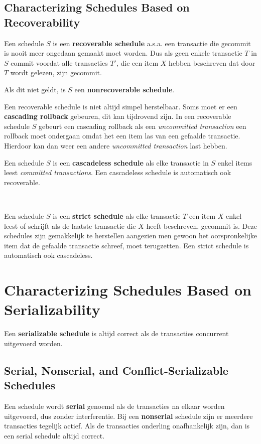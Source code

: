 \subsection{Characterizing Schedules Based on Recoverability}
Een schedule $S$ is een \textbf{recoverable schedule} a.s.a. een transactie die gecommit is nooit meer ongedaan gemaakt moet worden. Dus als geen enkele transactie $T$ in $S$ commit voordat alle transacties $T'$, die een item $X$ hebben beschreven dat door $T$ wordt gelezen, zijn gecommit.

Als dit niet geldt, is $S$ een \textbf{nonrecoverable schedule}.

\newpage
\noindent Een recoverable schedule is niet altijd simpel herstelbaar. Soms moet er een \textbf{cascading rollback} gebeuren, dit kan tijdrovend zijn. In een recoverable schedule $S$ gebeurt een cascading rollback als een \textit{uncommitted transaction} een rollback moet ondergaan omdat het een item las van een gefaalde transactie. Hierdoor kan dan weer een andere \textit{uncommitted transaction} last hebben.

Een schedule $S$ is een \textbf{cascadeless schedule} als elke transactie in $S$ enkel items leest \textit{committed transactions}. Een cascadeless schedule is automatisch ook recoverable.

~

\noindent Een schedule $S$ is een \textbf{strict schedule} als elke transactie $T$ een item $X$ enkel leest of schrijft als de laatste transactie die $X$ heeft beschreven, gecommit is. Deze schedules zijn gemakkelijk te herstellen aangezien men gewoon het oorspronkelijke item dat de gefaalde transactie schreef, moet terugzetten. Een strict schedule is automatisch ook cascadeless.



\section{Characterizing Schedules Based on Serializability}
Een \textbf{serializable schedule} is altijd correct als de transacties concurrent uitgevoerd worden.


\subsection{Serial, Nonserial, and Conflict-Serializable Schedules}
Een schedule wordt \textbf{serial} genoemd als de transacties na elkaar worden uitgevoerd, dus zonder interferentie. Bij een \textbf{nonserial} schedule zijn er meerdere transacties tegelijk actief. Als de transacties onderling onafhankelijk zijn, dan is een serial schedule altijd correct.

